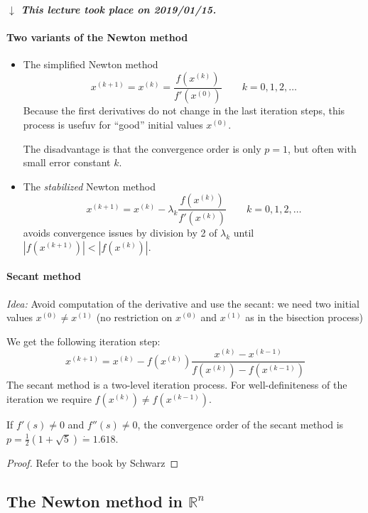 \documentclass[a4paper]{article}
\numberwithin{lecref}{section}
\theoremstyle{break}
\newcommand{\dateref}[1]{%
  \begin{mdframed}[backgroundcolor=gray!10,innerbottommargin=0pt,innertopmargin=0pt]
    \paragraph{\textit{$\downarrow$ This lecture took place on #1.}}%
  \end{mdframed}%
}
\newcommand{\Abs}[1]{\left|#1\right|}
\begin{document}
\dateref{2019/01/15}

\paragraph{Two variants of the Newton method}


\begin{itemize}
  \item The simplified Newton method
    \[ x^{(k+1)} = x^{(k)} = \frac{f(x^{(k)})}{f'(x^{(0)})} \qquad k = 0, 1, 2, \dots \]
    Because the first derivatives do not change in the last iteration steps, this process is usefuv for \enquote{good} initial values $x^{(0)}$.

    The disadvantage is that the convergence order is only $p = 1$,
    but often with small error constant $k$.
  \item The \emph{stabilized} Newton method
    \[ x^{(k+1)} = x^{(k)} - \lambda_k \frac{f(x^{(k)})}{f'(x^{(k)})} \qquad k = 0, 1, 2, \dots \]
    avoids convergence issues by division by 2 of $\lambda_k$ until $\Abs{f(x^{(k+1)})} < \Abs{f(x^{(k)})}$.
\end{itemize}

\paragraph{Secant method}

\emph{Idea:}
  Avoid computation of the derivative and use the secant:
  we need two initial values $x^{(0)} \neq x^{(1)}$
  (no restriction on $x^{(0)}$ and $x^{(1)}$ as in the bisection process)

We get the following iteration step:
\[ x^{(k+1)} = x^{(k)} - f(x^{(k)}) \frac{x^{(k)} - x^{(k-1)}}{f(x^{(k)}) - f(x^{(k-1)})} \]
The secant method is a two-level iteration process.
For well-definiteness of the iteration we require $f(x^{(k)}) \neq f(x^{(k-1)})$.

\begin{theorem}
  \label{theorem:6-9}
  If $f'(s) \neq 0$ and $f''(s) \neq 0$,
  the convergence order of the secant method is $p = \frac 12 (1 + \sqrt{5}) \dot= 1.618$.
\end{theorem}

\begin{proof}
  Refer to the book by Schwarz
\end{proof}

\subsection{The Newton method in $\mathbb R^n$}
\end{document}
